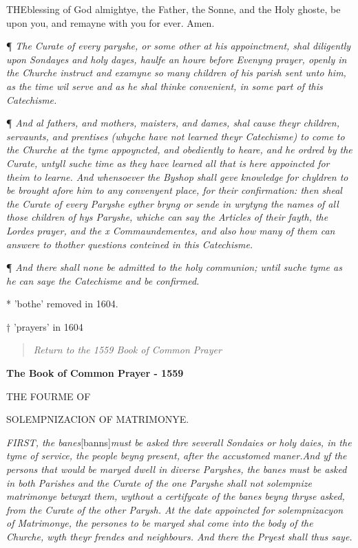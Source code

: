 THE\textbf{}blessing of God almightye, the Father, the Sonne, and the Holy ghoste,
be upon you, and remayne with you for ever. Amen.

¶ \emph{The Curate of every paryshe, or some other at his appoinctment,
shal diligently upon Sondayes and holy dayes, haulfe an houre before Evenyng
prayer, openly in the Churche instruct and examyne so many children of
his parish sent unto him, as the time wil serve and as he shal thinke
convenient, in some part of this Catechisme.}

¶
\emph{And al fathers, and mothers, maisters, and dames, shal cause theyr
children, servaunts, and prentises (whyche have not learned theyr Catechisme)
to come to the Churche at the tyme appoyncted, and obediently to heare,
and he ordred by the Curate, untyll suche time as they have learned all
that is here appoincted for theim to learne. And whensoever the Byshop
shall geve knowledge for chyldren to be brought afore him to any convenyent
place, for their confirmation: then sheal the Curate of every Paryshe
eyther bryng or sende in wrytyng the names of all those children of hys
Paryshe, whiche can say the Articles of their fayth, the Lordes prayer,
and the x Commaundementes, and also how many of them can answere to thother
questions conteined in this Catechisme.}

¶
\emph{And there shall none be admitted to the holy communion; until suche
tyme as he can saye the Catechisme and be confirmed.}

* 'bothe'
removed in 1604.

†
'prayers'
in 1604

\begin{quote}

\emph{Return to the 1559
Book of Common Prayer}

\end{quote}


\textbf{The Book of Common Prayer - 1559}

THE
FOURME OF

SOLEMPNIZACION
OF MATRIMONYE.

\xsection{ }

\emph{F}\emph{IRST,
the banes}[banns]\emph{must be asked thre severall Sondaies or holy daies, in the tyme of service,
the people beyng present, after the accustomed maner.}\emph{And
yf the persons that would be maryed dwell in diverse Paryshes, the banes
must be asked in both Parishes and the Curate of the one Paryshe shall
not solempnize matrimonye betwyxt them, wythout a certifycate of the banes
beyng thryse asked, from the Curate of the other Parysh. At the date appoincted
for solempnizacyon of Matrimonye, the persones to be maryed shal come
into the body of the Churche, wyth theyr frendes and neighbours. And there
the Pryest shall thus saye.}

